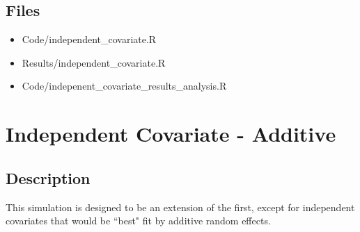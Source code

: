 \documentclass[12pt]{article}
\begin{document}
\subsection{Files}
  \begin{itemize}
    \item Code/independent\_covariate.R
    \item Results/independent\_covariate.R
    \item Code/indepenent\_covariate\_results\_analysis.R
  \end{itemize}

\section{Independent Covariate - Additive}
\subsection{Description}
  This simulation is designed to be an extension of the first, except for independent covariates that would be ``best" fit by additive random effects.
\end{document}
